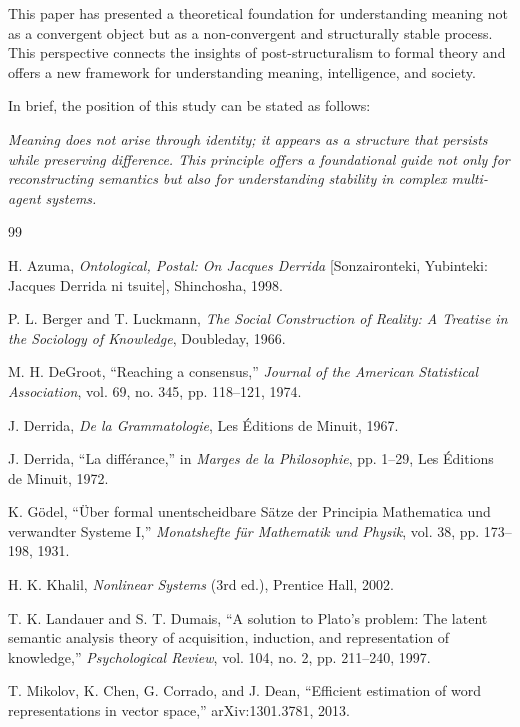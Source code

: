 \documentclass[11pt,a4paper]{article}
\theoremstyle{definition}
\begin{document}
This paper has presented a theoretical foundation for understanding meaning not as a convergent object but as a non-convergent and structurally stable process. This perspective connects the insights of post-structuralism to formal theory and offers a new framework for understanding meaning, intelligence, and society.

In brief, the position of this study can be stated as follows:

\textit{Meaning does not arise through identity; it appears as a structure that persists while preserving difference. This principle offers a foundational guide not only for reconstructing semantics but also for understanding stability in complex multi-agent systems.}

\begin{thebibliography}{99}

 H. Azuma, \textit{Ontological, Postal: On Jacques Derrida} [Sonzaironteki, Yubinteki: Jacques Derrida ni tsuite], Shinchosha, 1998.

 P. L. Berger and T. Luckmann, \textit{The Social Construction of Reality: A Treatise in the Sociology of Knowledge}, Doubleday, 1966.

 M. H. DeGroot, ``Reaching a consensus,'' \textit{Journal of the American Statistical Association}, vol. 69, no. 345, pp. 118--121, 1974.

 J. Derrida, \textit{De la Grammatologie}, Les Éditions de Minuit, 1967.

 J. Derrida, ``La différance,'' in \textit{Marges de la Philosophie}, pp. 1--29, Les Éditions de Minuit, 1972.

 K. Gödel, ``Über formal unentscheidbare Sätze der Principia Mathematica und verwandter Systeme I,'' \textit{Monatshefte für Mathematik und Physik}, vol. 38, pp. 173--198, 1931.

 H. K. Khalil, \textit{Nonlinear Systems} (3rd ed.), Prentice Hall, 2002.

 T. K. Landauer and S. T. Dumais, ``A solution to Plato's problem: The latent semantic analysis theory of acquisition, induction, and representation of knowledge,'' \textit{Psychological Review}, vol. 104, no. 2, pp. 211--240, 1997.

 T. Mikolov, K. Chen, G. Corrado, and J. Dean, ``Efficient estimation of word representations in vector space,'' arXiv:1301.3781, 2013.


\end{thebibliography}
\end{document}
